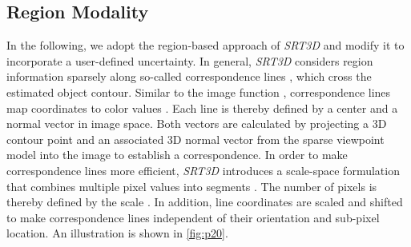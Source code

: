 \documentclass[10pt,twocolumn,letterpaper]{article}
\begin{document}
\subsection{Region Modality}\label{ssec:p2}
In the following, we adopt the region-based approach of \textit{SRT3D} \cite{Stoiber2020b,Stoiber2021} and modify it to incorporate a user-defined uncertainty.
In general, \textit{SRT3D} considers region information sparsely along so-called correspondence lines , which cross the estimated object contour.
Similar to the image function , correspondence lines map coordinates  to color values .
Each line is thereby defined by a center  and a normal vector  in image space.
Both vectors are calculated by projecting a 3D contour point  and an associated 3D normal vector  from the sparse viewpoint model into the image to establish a correspondence.
In order to make correspondence lines more efficient, \textit{SRT3D} introduces a scale-space formulation that combines multiple pixel values  into segments .
The number of pixels is thereby defined by the scale .
In addition, line coordinates  are scaled and shifted to make correspondence lines independent of their orientation and sub-pixel location.
An illustration is shown in \cref{fig:p20}.
\end{document}
